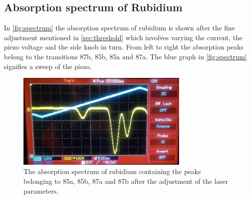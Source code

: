 \FloatBarrier

\subsection{Absorption spectrum of Rubidium}
In \autoref{fig:spectrum} the absorption spectrum of rubidium is shown after the fine adjustment mentioned in \ref{sec:threshold} which involves varying the current, the piezo voltage and the side knob in turn.
From left to right the absorption peaks belong to the transitions 87b, 85b, 85a and 87a.
The blue graph in \autoref{fig:spectrum} signifies a sweep of the piezo.
\begin{figure}[ht]
    \center
    \includegraphics[width=0.75\textwidth]{bilder/spectrum.jpg}
    \caption{The absorption spectrum of rubidium containing the peaks belonging to 85a, 85b, 87a and 87b after the adjustment of the laser parameters. \cite{anleitungHeNe}}
    \label{fig:spectrum}
\end{figure}

\FloatBarrier